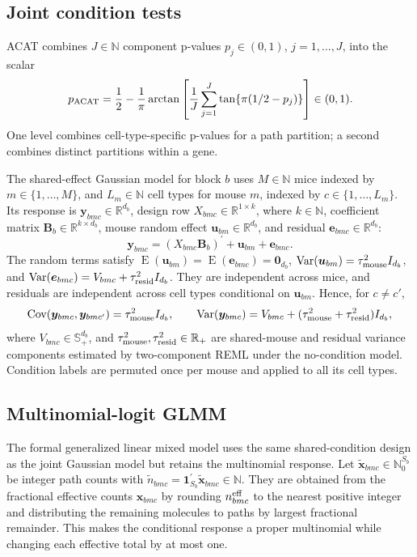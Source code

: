\documentclass[11pt]{article}
\newcommand{\Beta}{\bm B}
\begin{document}
\subsection*{Joint condition tests}

ACAT combines \(J\in\mathbb N\) component p-values \(p_j\in(0,1)\), \(j=1,\ldots,J\), into the scalar \[
 p_{\rm ACAT}=\frac12-\frac1\pi\arctan\left[
 \frac1J\sum_{j=1}^J\tan\{\pi(1/2-p_j)\}\right]\in(0,1).
\]
One level combines cell-type-specific p-values for a path partition; a second combines distinct partitions within a gene.

The shared-effect Gaussian model for block \(b\) uses \(M\in\mathbb N\) mice indexed by \(m\in\{1,\ldots,M\}\), and \(L_m\in\mathbb N\) cell types for mouse \(m\), indexed by \(c\in\{1,\ldots,L_m\}\). Its response is \(\bm y_{bmc}\in\mathbb R^{d_b}\), design row \(X_{bmc}\in\mathbb R^{1\times k}\), where \(k\in\mathbb N\), coefficient matrix \(\Beta_b\in\mathbb R^{k\times d_b}\), mouse random effect \(\bm u_{bm}\in\mathbb R^{d_b}\), and residual \(\bm e_{bmc}\in\mathbb R^{d_b}\): \[
 \bm y_{bmc}=(X_{bmc}\Beta_b)^\prime+\bm u_{bm}+\bm e_{bmc}.
\]
The random terms satisfy \(\operatorname E(\bm u_{bm})=\operatorname E(\bm e_{bmc}) =\bm0_{d_b}\), \(\operatorname{Var}(\bm u_{bm})=\tau_{\rm mouse}^2I_{d_b}\), and \(\operatorname{Var}(\bm e_{bmc})= V_{bmc}+\tau_{\rm resid}^2I_{d_b}\). They are independent across mice, and residuals are independent across cell types conditional on \(\bm u_{bm}\). Hence, for \(c\neq c'\), \[
 \operatorname{Cov}(\bm y_{bmc},\bm y_{bmc'})=
 \tau_{\rm mouse}^2I_{d_b},\qquad
 \operatorname{Var}(\bm y_{bmc})=
 V_{bmc}+(\tau_{\rm mouse}^2+\tau_{\rm resid}^2)I_{d_b},
\]
where \(V_{bmc}\in\mathbb S_+^{d_b}\), and \(\tau_{\rm mouse}^2,\tau_{\rm resid}^2\in\mathbb R_+\) are shared-mouse and residual variance components estimated by two-component REML under the no-condition model. Condition labels are permuted once per mouse and applied to all its cell types.

\subsection*{Multinomial-logit GLMM}

The formal generalized linear mixed model uses the same shared-condition design as the joint Gaussian model but retains the multinomial response. Let \(\widetilde{\bm x}_{bmc}\in\mathbb N_0^{S_b}\) be integer path counts with \(\widetilde n_{bmc}=\bm1_{S_b}^\prime\widetilde{\bm x}_{bmc} \in\mathbb N\). They are obtained from the fractional effective counts \(\bm x_{bmc}\) by rounding \(n_{bmc}^{\rm eff}\) to the nearest positive integer and distributing the remaining molecules to paths by largest fractional remainder. This makes the conditional response a proper multinomial while changing each effective total by at most one.
\end{document}
